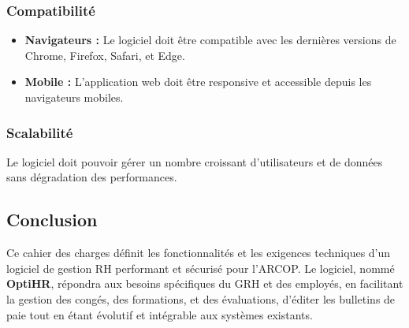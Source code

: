 \subsubsection{Compatibilité}
\begin{itemize}
    \item \textbf{Navigateurs :} Le logiciel doit être compatible avec les dernières versions de Chrome, Firefox, Safari, et Edge.
    \item \textbf{Mobile :} L'application web doit être responsive et accessible depuis les navigateurs mobiles.
\end{itemize}

\subsubsection{Scalabilité}
Le logiciel doit pouvoir gérer un nombre croissant d'utilisateurs et de données sans dégradation des performances.

\subsection{Conclusion}
Ce cahier des charges définit les fonctionnalités et les exigences techniques d'un logiciel de gestion RH performant et sécurisé pour l'ARCOP. Le logiciel, nommé \textbf{OptiHR}, répondra aux besoins spécifiques du GRH et des employés, en facilitant la gestion des congés, des formations, et des évaluations, d'éditer les bulletins de paie tout en étant évolutif et intégrable aux systèmes existants.


\clearpage
